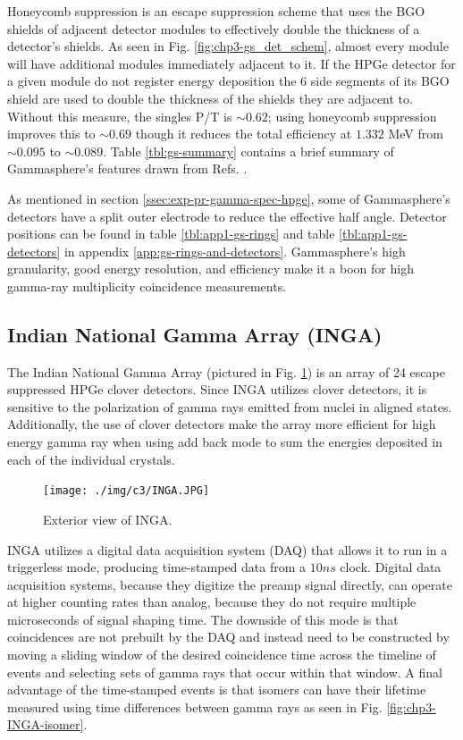 Honeycomb suppression is an escape suppression scheme that uses the BGO shields of adjacent detector modules to effectively double the thickness of a detector's shields. As seen in Fig. \ref{fig:chp3-gs_det_schem}, almost every module will have additional modules immediately adjacent to it. If the HPGe detector for a given module do not register energy deposition the 6 side segments of its BGO shield are used to double the thickness of the shields they are adjacent to. Without this measure, the singles P/T is $\sim0.62$; using honeycomb suppression improves this to $\sim0.69$ though it reduces the total efficiency at $1.332$ MeV from $\sim0.095$ to $\sim0.089$\cite{TheGS}. Table \ref{tbl:gs-summary} contains a brief summary of Gammasphere's features drawn from Refs. \cite{TheGS,SimulatedResGS,largeArrays,GSComptonSuppression}.

As mentioned in section \ref{ssec:exp-pr-gamma-spec-hpge}, some of Gammasphere's detectors have a split outer electrode to reduce the effective half angle. Detector positions can be found in table \ref{tbl:app1-gs-rings} and table \ref{tbl:app1-gs-detectors} in appendix \ref{app:gs-rings-and-detectors}. Gammasphere's high granularity, good energy resolution, and efficiency make it a boon for high gamma-ray multiplicity coincidence measurements.

\subsection{Indian National Gamma Array (INGA)}
\label{ssec:exp-pr-gamma-spec-inga}
The Indian National Gamma Array (pictured in Fig. \ref{fig:chp3-INGA}) is an array of 24 escape suppressed HPGe clover detectors\cite{ingaAtIUAC}. Since INGA utilizes clover detectors, it is sensitive to the polarization of gamma rays emitted from nuclei in aligned states\cite{cloverDet}. Additionally, the use of clover detectors make the array more efficient for high energy gamma ray when using add back mode to sum the energies deposited in each of the individual crystals.

\begin{figure}[ht!]
	\centerline{\texttt{[image: ./img/c3/INGA.JPG]}}
	\caption{Exterior view of INGA.}
	\label{fig:chp3-INGA}
\end{figure}

INGA utilizes a digital data acquisition system (DAQ) that allows it to run in a triggerless mode, producing time-stamped data from a $10ns$ clock\cite{IngaDigitalDAQ}. Digital data acquisition systems, because they digitize the preamp signal directly, can operate at higher counting rates than analog, because they do not require multiple microseconds of signal shaping time. The downside of this mode is that coincidences are not prebuilt by the DAQ and instead need to be constructed by moving a sliding window of the desired coincidence time across the timeline of events and selecting sets of gamma rays that occur within that window. A final advantage of the time-stamped events is that isomers can have their lifetime measured using time differences between gamma rays as seen in Fig. \ref{fig:chp3-INGA-isomer}.

